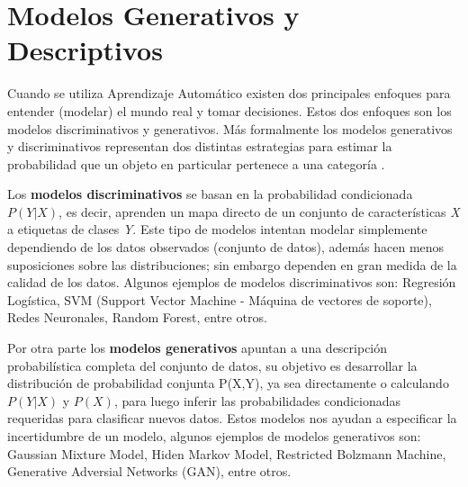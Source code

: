 \section{Modelos Generativos y Descriptivos}

Cuando se utiliza Aprendizaje Autom\'{a}tico existen dos principales enfoques para entender (modelar) el mundo real y tomar decisiones. Estos dos enfoques son los modelos discriminativos y generativos. M\'{a}s formalmente los modelos generativos y discriminativos representan dos distintas estrategias para estimar la probabilidad que un objeto en particular pertenece a una categor\'{i}a \cite{42}.


\vspace{5mm} %

Los \textbf{modelos discriminativos} se basan en la probabilidad condicionada $P(Y|X)$, es decir, aprenden un mapa directo de un conjunto de caracter\'{i}sticas \textit{X} a etiquetas de clases \textit{Y}. Este tipo de modelos intentan modelar simplemente dependiendo de los datos observados (conjunto de datos), adem\'{a}s hacen menos suposiciones sobre las distribuciones; sin embargo dependen en gran medida de la calidad de los datos. Algunos ejemplos de modelos discriminativos son: Regresi\'{o}n Log\'{i}stica, SVM (Support Vector Machine - M\'{a}quina de vectores de soporte), Redes Neuronales, Random Forest, entre otros.

\vspace{5mm} %

Por otra parte los \textbf{modelos generativos} apuntan a una descripci\'{o}n probabil\'{i}stica completa del conjunto de datos, su objetivo es desarrollar la distribuci\'{o}n de probabilidad conjunta P(X,Y), ya sea directamente o calculando $P(Y|X)$ y $P(X)$, para luego inferir las probabilidades condicionadas requeridas para clasificar nuevos datos. Estos modelos nos ayudan a especificar la incertidumbre de un modelo, algunos ejemplos de modelos generativos son: Gaussian Mixture Model, Hiden Markov Model, Restricted Bolzmann Machine, Generative Adversial Networks (GAN), entre otros.

\vspace{5mm} %

